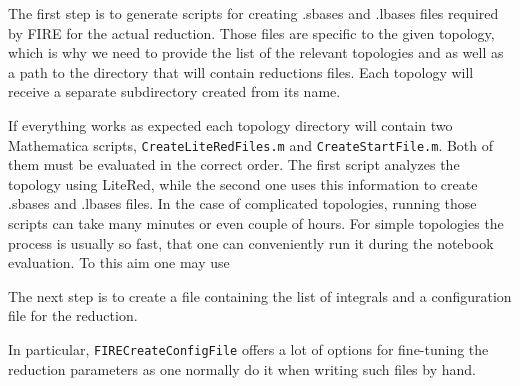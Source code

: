 \documentclass[../FeynHelpersManual.tex]{subfiles}
\begin{document}
The first step is to generate scripts for creating .sbases and .lbases
files required by FIRE for the actual reduction. Those files are
specific to the given topology, which is why we need to provide the list
of the relevant topologies and as well as a path to the directory that
will contain reductions files. Each topology will receive a separate
subdirectory created from its name.

\begin{Shaded}
\begin{Highlighting}[]
\OperatorTok{[}\OperatorTok{,}\OperatorTok{[]]}
\end{Highlighting}
\end{Shaded}

If everything works as expected each topology directory will contain two
Mathematica scripts, \texttt{CreateLiteRedFiles.m} and
\texttt{CreateStartFile.m}. Both of them must be evaluated in the
correct order. The first script analyzes the topology using LiteRed,
while the second one uses this information to create .sbases and .lbases
files. In the case of complicated topologies, running those scripts can
take many minutes or even couple of hours. For simple topologies the
process is usually so fast, that one can conveniently run it during the
notebook evaluation. To this aim one may use

\begin{Shaded}
\begin{Highlighting}[]
\OperatorTok{[}\OperatorTok{[],}\OperatorTok{]}
\end{Highlighting}
\end{Shaded}

The next step is to create a file containing the list of integrals and a
configuration file for the reduction.

\begin{Shaded}
\begin{Highlighting}[]
\OperatorTok{[}\OperatorTok{,}\OperatorTok{[]]}
\OperatorTok{[}\OperatorTok{,}\OperatorTok{,}\OperatorTok{[]]}
\end{Highlighting}
\end{Shaded}

In particular, \texttt{FIRECreateConfigFile} offers a lot of options for
fine-tuning the reduction parameters as one normally do it when writing
such files by hand.
\end{document}
